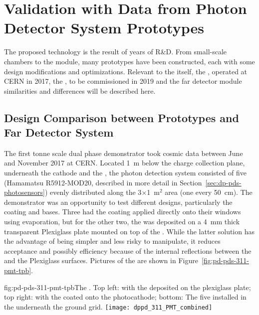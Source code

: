 \section{Validation with Data from Photon Detector System Prototypes}
\label{sec:dp-pds-prototypes}

The    proposed technology is the result of years of R\&D. From small-scale chambers to the  module, many prototypes have been constructed, each with some design modifications and optimizations. 
Relevant to the  itself, the , operated at CERN in 2017, the , to be commissioned in 2019 and the  far detector module similarities and differences will be described here.

\subsection{Design Comparison between Prototypes and Far Detector System}
The first tonne scale dual phase   demonstrator took cosmic data between June and November \num{2017} at CERN. 
Located \SI{1}{m} below the charge collection plane, underneath the cathode and the , the photon detection system consisted of five  (Hamamatsu R5912-MOD20, described in more detail in Section~\ref{sec:dp-pds-photosensors}) evenly distributed along the 3$\times$1~m$^2$ area (one  every \SI{50}{cm}). The demonstrator was an opportunity to test different  designs, particularly the  coating and  bases. Three  had the  coating applied directly onto their windows using evaporation, but for the other two, the  was deposited on a \SI{4}{\mm} thick transparent Plexiglass plate mounted on top of the . 
While the latter solution has the advantage of being simpler and less risky to manipulate, it reduces acceptance and possibly efficiency because of the internal reflections between the  and the Plexiglass surfaces. 
Pictures of the   are shown in Figure~\ref{fig:pd-pds-311-pmt-tpb}.

\begin{dunefigure}{fig:pd-pds-311-pmt-tpb}{The  . Top left:  with the  deposited on the plexiglass plate; top right:  with the  coated onto the photocathode; bottom: The five  installed in the  underneath the ground grid.}
\texttt{[image: dppd\_311\_PMT\_combined]}
\end{dunefigure}

